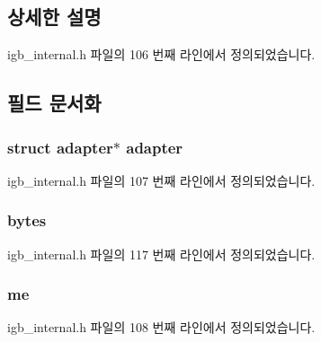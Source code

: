 \subsection{상세한 설명}


igb\+\_\+internal.\+h 파일의 106 번째 라인에서 정의되었습니다.



\subsection{필드 문서화}
\subsubsection[{\texorpdfstring{adapter}{adapter}}]{\setlength{\rightskip}{0pt plus 5cm}struct {\bf adapter}$\ast$ {\bf adapter}}\hypertarget{structtx__ring_a807e6014970a3d469e197cd9ec25229c}{}\label{structtx__ring_a807e6014970a3d469e197cd9ec25229c}


igb\+\_\+internal.\+h 파일의 107 번째 라인에서 정의되었습니다.

\subsubsection[{\texorpdfstring{bytes}{bytes}}]{ bytes}\hypertarget{structtx__ring_a7056b21e5e7773c9205b38f00a3a75c2}{}\label{structtx__ring_a7056b21e5e7773c9205b38f00a3a75c2}


igb\+\_\+internal.\+h 파일의 117 번째 라인에서 정의되었습니다.

\subsubsection[{\texorpdfstring{me}{me}}]{ me}\hypertarget{structtx__ring_af754e6af13b532f2bebcaa3828ea795c}{}\label{structtx__ring_af754e6af13b532f2bebcaa3828ea795c}


igb\+\_\+internal.\+h 파일의 108 번째 라인에서 정의되었습니다.

